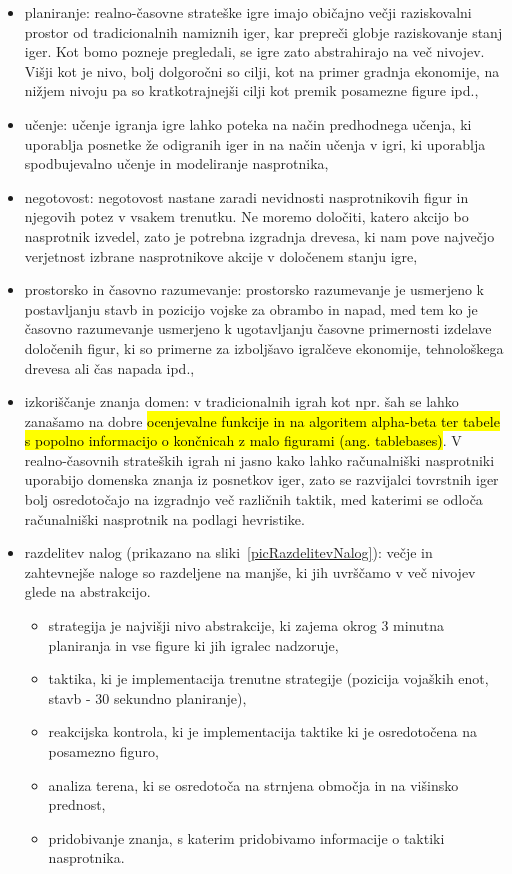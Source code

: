\documentclass[a4paper, 12pt]{book}
\begin{document}
\begin{itemize}
	\item planiranje: realno-časovne strateške igre imajo običajno večji raziskovalni prostor od tradicionalnih namiznih iger, kar prepreči globje raziskovanje stanj iger. 
	Kot bomo pozneje pregledali, se igre zato abstrahirajo na več nivojev.
	Višji kot je nivo, bolj dolgoročni so cilji, kot na primer gradnja ekonomije, na nižjem nivoju pa so kratkotrajnejši cilji kot premik posamezne figure ipd.,
	\item učenje: učenje igranja igre lahko poteka na način predhodnega učenja, ki uporablja posnetke že odigranih iger in na način učenja v igri, ki uporablja spodbujevalno učenje in modeliranje nasprotnika,
	\item negotovost: negotovost nastane zaradi nevidnosti nasprotnikovih figur in njegovih potez v vsakem trenutku. 
	Ne moremo določiti, katero akcijo bo nasprotnik izvedel, zato je potrebna izgradnja drevesa, ki nam pove največjo verjetnost izbrane nasprotnikove akcije v določenem stanju igre,
	\item prostorsko in časovno razumevanje: prostorsko razumevanje je usmerjeno k postavljanju stavb in pozicijo vojske za obrambo in napad, med tem ko je časovno razumevanje usmerjeno k ugotavljanju časovne primernosti izdelave določenih figur, ki so primerne za izboljšavo igralčeve ekonomije, tehnološkega drevesa ali čas napada ipd.,
	\item izkoriščanje znanja domen: v tradicionalnih igrah kot npr. šah se lahko zanašamo na dobre \hl{ocenjevalne funkcije in na algoritem alpha-beta  ter tabele s popolno informacijo o končnicah z malo figurami (ang. tablebases)}.
	V realno-časovnih strateških igrah ni jasno kako lahko računalniški nasprotniki uporabijo domenska znanja iz posnetkov iger, zato se razvijalci tovrstnih iger bolj osredotočajo na izgradnjo več različnih taktik, med katerimi se odloča računalniški nasprotnik na podlagi hevristike.
	\item razdelitev nalog (prikazano na sliki~\ref{picRazdelitevNalog}): večje in zahtevnejše naloge so razdeljene na manjše, ki jih uvrščamo v več nivojev glede na abstrakcijo.
	\begin{itemize}
		\item strategija je najvišji nivo abstrakcije, ki zajema okrog 3 minutna planiranja in vse figure ki jih igralec nadzoruje, 
		\item taktika, ki je implementacija trenutne strategije (pozicija vojaških enot, stavb - 30 sekundno planiranje),
		\item reakcijska kontrola, ki je implementacija taktike ki je osredotočena na posamezno figuro,
		\item analiza terena, ki se osredotoča na strnjena območja in na višinsko prednost,
		\item pridobivanje znanja, s katerim pridobivamo informacije o taktiki nasprotnika.
	\end{itemize}


\end{itemize}
\end{document}
